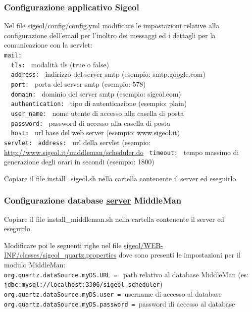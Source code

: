 \documentclass[11pt,a4paper]{article}
\begin{document}
\subsubsection{Configurazione applicativo Sigeol}

Nel file \url{sigeol/config/config.yml} modificare le impostazioni relative alla configurazione dell'email per l'inoltro dei messaggi ed i dettagli per la comunicazione con la servlet:\\
\verb|mail:|\\
\verb|  tls: | modalità tls (true o false)\\
\verb|  address: | indirizzo del server smtp (esempio: smtp.google.com)\\
\verb|  port: | porta del server smtp (esempio: 578)\\
\verb|  domain: | dominio del server smtp (esempio: sigeol.com)\\
\verb|  authentication: | tipo di autenticazione (esempio: plain)\\
\verb|  user_name: | nome utente di accesso alla casella di posta\\
\verb|  password: | password di accesso alla casella di posta\\
\verb|  host: | url base del web server (esempio: www.sigeol.it)\\

\verb|servlet:|
\verb| address: | url della servlet (esempio: \url{http://www.sigeol.it/middleman/scheduler.do}
\verb| timeout: | tempo massimo di generazione degli orari in secondi (esempio: 1800)

Copiare il file install\_sigeol.sh nella cartella contenente il server ed eseguirlo.



\subsubsection{Configurazione database \underline{server} MiddleMan}

Copiare il file install\_middleman.sh nella cartella contenente il server ed eseguirlo.

Modificare poi le seguenti righe nel file \url{sigeol/WEB-INF/classes/sigeol_quartz.properties} dove sono presenti le impostazioni per il modulo MiddleMan:\\
\verb|org.quartz.dataSource.myDS.URL = | path relativo al database MiddleMan (es: \verb|jdbc:mysql://localhost:3306/sigeol_scheduler|)\\
\verb|org.quartz.dataSource.myDS.user = |username di accesso al database\\
\verb|org.quartz.dataSource.myDS.password = |password di accesso al database\\
\end{document}
